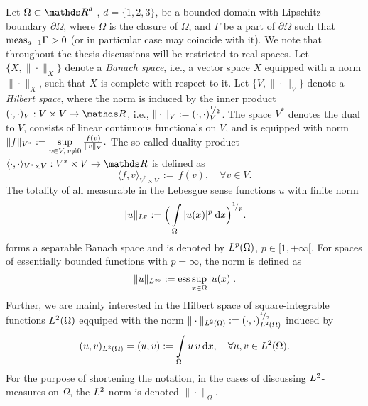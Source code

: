 \noindent
Let $\Omega \subset \Rd$ , $d = \{1, 2, 3\}$, be a bounded domain 
with Lipschitz 
boundary $\partial \Omega$, where $\overline{\Omega}$ is the closure of $\Omega$,
and 
$\Gamma$ be a part of $\partial \Omega$ such that $\mathrm{meas}_{d - 1} \Gamma > 0$ 
(or in particular case may coincide with it). We note that throughout the
thesis discussions will be restricted to real spaces.
Let $\{X, \|\cdot \|_{X}\}$ denote a {\em Banach space}, i.e., a vector space $X$ 
equipped with a norm $\|\cdot\|_X$, such that $X$ is complete with respect to it.
Let $\{V, \|\cdot\|_V\}$ denote a {\em Hilbert space}, where the norm is induced 
by the inner product 
$(\cdot, \cdot)_V: V \times V \rightarrow \Real$, i.e., 
$\|\cdot\|_V := (\cdot, \cdot)^{{}^{1}\!/_{2}}_V$. The space $V^*$ denotes the dual 
to $V$, consists of linear continuous functionals on $V$, and is equipped with norm 
%
$\|f\|_{V^*} := \sup\limits_{v \in V, \, v \neq 0} \tfrac{f(v)}{\|v\|_V}.
$
%
The so-called duality product \linebreak
$\langle \cdot, \cdot \rangle_{V^* \times V}: V^* \times V \rightarrow \Real$ is 
defined as 
%
\begin{equation}
\langle f, v \rangle_{V^* \times V} \, := \,f(v), \quad \forall v \in V.
\label{eq:duality-product}
\end{equation}
%
The totality of all measurable in the Lebesgue sense functions $u$ with finite norm
%
\begin{equation*}
\| u\|_{\L{p}} := \Big( \Int_{\Omega} |u(x)|^p \dx \Big)^{\rfrac{1}{p}}.
\end{equation*}
%
forms a separable Banach space and is denoted by 
$L^{p}(\Omega)$, $p \in [1, +\infty[$.
%
For spaces of essentially bounded functions with $p = \infty$, the 
norm is defined as \linebreak
%
\begin{equation*}
\| u\|_{\L{\infty}} := {\rm ess} \Sup_{x \in \Omega} |u(x)|. 
\label{eq:Linfty-norm}
\end{equation*}
%
Further, we are mainly interested in the Hilbert space of square-integrable 
functions 
$L^{2}(\Omega)$ eqquiped with the norm 
$\| \cdot \|_{L^{2}(\Omega)} := (\cdot, \cdot)^{{}^{1}\!/_{2}}_{L^{2}(\Omega)}$
induced by 
%
\begin{equation*}
(u, v)_{\L{2}(\Omega)} = (u, v):= \Int_{\Omega} u \, v \dx, 
\quad \forall u, v \in \L{2}(\Omega).
\end{equation*}
%
For the purpose of shortening the notation, in the cases of discussing 
$L^{2}$-measures on $\Omega$, the $L^{2}$-norm is denoted $\| \cdot \|_{\Omega}$. 

